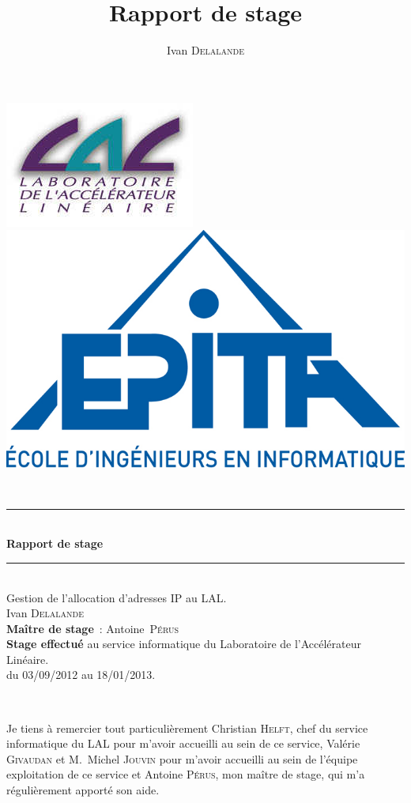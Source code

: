 \documentclass[12pt,a4paper,twoside]{report}
\title{Rapport de stage}
\author{Ivan \textsc{Delalande}}
\newcommand{\HRule}{\rule{\linewidth}{0.5mm}}
\begin{document}
\thispagestyle{empty}

\begin{titlepage}
	\begin{center}
		\includegraphics[scale=0.23]{img/lal.jpg} ~
		\includegraphics[scale=1]{img/epita.jpg}

		~\\[2cm]
		\HRule
		\\\Huge{\textbf{Rapport de stage}}\\
		\HRule
		\\[2cm]
		\Large{Gestion de l’allocation d’adresses IP au LAL.}
		\\[3.0cm]
		Ivan \textsc{Delalande}
		\\[1.0cm]
		\textbf{Maître de stage}~: Antoine~\textsc{Pérus}
		\\[0.5cm]
		\textbf{Stage effectué} au service informatique du Laboratoire de
		l’Accélérateur Linéaire.
		\\[0.5cm]
		du 03/09/2012 au 18/01/2013.
	\end{center}
\end{titlepage}


\thispagestyle{empty}

~
\vspace{2cm}

Je tiens à remercier tout particulièrement Christian \textsc{Helft}, chef du
service informatique du LAL pour m’avoir accueilli au sein de ce service,
Valérie \textsc{Givaudan} et M.~Michel \textsc{Jouvin} pour m’avoir
accueilli au sein de l’équipe exploitation de ce service et Antoine
\textsc{Pérus}, mon maître de stage, qui m’a régulièrement apporté son aide.\\
\end{document}
